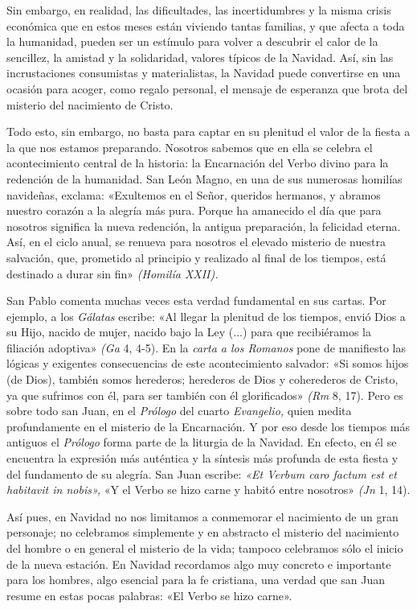 \documentclass[]{article}
\begin{document}
Sin embargo, en realidad, las dificultades, las incertidumbres y la
misma crisis económica que en estos meses están viviendo tantas
familias, y que afecta a toda la humanidad, pueden ser un estímulo para
volver a descubrir el calor de la sencillez, la amistad y la
solidaridad, valores típicos de la Navidad. Así, sin las incrustaciones
consumistas y materialistas, la Navidad puede convertirse en una ocasión
para acoger, como regalo personal, el mensaje de esperanza que brota del
misterio del nacimiento de Cristo.

Todo esto, sin embargo, no basta para captar en su plenitud el valor de
la fiesta a la que nos estamos preparando. Nosotros sabemos que en ella
se celebra el acontecimiento central de la historia: la Encarnación del
Verbo divino para la redención de la humanidad. San León Magno, en una
de sus numerosas homilías navideñas, exclama: «Exultemos en el Señor,
queridos hermanos, y abramos nuestro corazón a la alegría más pura.
Porque ha amanecido el día que para nosotros significa la nueva
redención, la antigua preparación, la felicidad eterna. Así, en el ciclo
anual, se renueva para nosotros el elevado misterio de nuestra
salvación, que, prometido al principio y realizado al final de los
tiempos, está destinado a durar sin fin» \emph{(Homilía XXII). }

San Pablo comenta muchas veces esta verdad fundamental en sus cartas.
Por ejemplo, a los \emph{Gálatas} escribe: «Al llegar la plenitud de los
tiempos, envió Dios a su Hijo, nacido de mujer, nacido bajo la Ley (...)
para que recibiéramos la filiación adoptiva» \emph{(Ga} 4, 4-5). En la
\emph{carta a los Romanos} pone de manifiesto las lógicas y exigentes
consecuencias de este acontecimiento salvador: «Si somos hijos (de
Dios), también somos herederos; herederos de Dios y coherederos de
Cristo, ya que sufrimos con él, para ser también con él glorificados»
\emph{(Rm} 8, 17). Pero es sobre todo san Juan, en el \emph{Prólogo} del
cuarto \emph{Evangelio,} quien medita profundamente en el misterio de la
Encarnación. Y por eso desde los tiempos más antiguos el \emph{Prólogo}
forma parte de la liturgia de la Navidad. En efecto, en él se encuentra
la expresión más auténtica y la síntesis más profunda de esta fiesta y
del fundamento de su alegría. San Juan escribe: \emph{«Et Verbum caro
factum est et habitavit in nobis»,} «Y el Verbo se hizo carne y habitó
entre nosotros» \emph{(Jn} 1, 14).

Así pues, en Navidad no nos limitamos a conmemorar el nacimiento de un
gran personaje; no celebramos simplemente y en abstracto el misterio del
nacimiento del hombre o en general el misterio de la vida; tampoco
celebramos sólo el inicio de la nueva estación. En Navidad recordamos
algo muy concreto e importante para los hombres, algo esencial para la
fe cristiana, una verdad que san Juan resume en estas pocas palabras:
«El Verbo se hizo carne».
\end{document}
